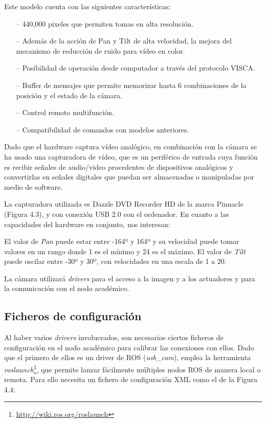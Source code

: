 \vspace{4.0cm}
Este modelo cuenta con las siguientes características:
\begin{itemize}
	\item[--] 440,000 pixeles que permiten tomas en alta resolución.
	\item[--] Además de la acción de Pan y Tilt de alta velocidad, la mejora del mecanismo de reducción de ruido para vídeo en color. 
	\item[--] Posibilidad de operación desde computador a través del protocolo VISCA.
	\item[--] Buffer de mensajes que permite memorizar hasta 6 combinaciones de la posición y el estado de la cámara. 
	\item[--] Control remoto multifunción. 
	\item[--] Compatibilidad de comandos con modelos anteriores.
\end{itemize}

Dado que el hardware captura vídeo analógico, en combinación con la cámara se ha usado una capturadora de vídeo, que es un periférico de entrada cuya función es recibir señales de audio/video procedentes de dispositivos analógicos y convertirlas en señales digitales que puedan ser almacenadas o manipuladas por medio de software.

La capturadora utilizada es Dazzle DVD Recorder HD de la marca Pinnacle (Figura 4.3), y con conexión USB 2.0 con el ordenador. En cuanto a las capacidades del hardware en conjunto, nos interesan:

El valor de \textit{Pan} puede estar entre -164º y 164º y su velocidad puede tomar valores en un rango donde 1 es el mínimo y 24 es el máximo. El valor de \textit{Tilt} puede oscilar entre -30º y  30º, con velocidades en una escala de 1 a 20.

La cámara utilizará \textit{drivers} para el acceso a la imagen y a los actuadores y para la comunicación con el nodo académico.

\subsection{Ficheros de configuración}
Al haber varios \textit{drivers} involucrados, son necesarios ciertos ficheros de configuración en el nodo académico para calibrar las conexiones con ellos. Dado que el primero de ellos es un driver de ROS (\textit{usb\_cam}), emplea la herramienta \textit{roslaunch}\footnote{\url{http://wiki.ros.org/roslaunch}}, que permite lanzar fácilmente múltiples nodos ROS de manera local o remota. Para ello necesita un fichero de configuración XML como el de la Figura 4.4: 

